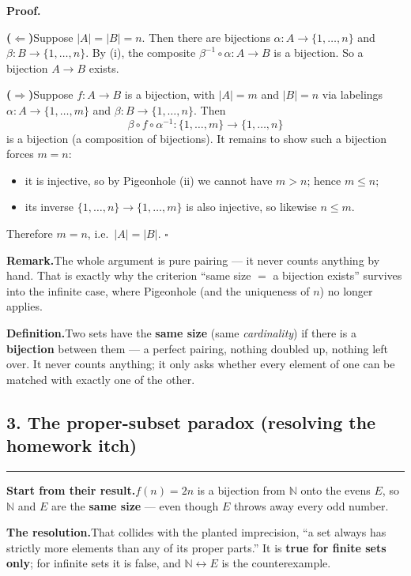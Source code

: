 \documentclass[12pt]{article}
\begin{document}
\textbf{Proof.}

\textbf{($\Leftarrow$)}\quad Suppose $|A| = |B| = n$. Then there are bijections $\alpha\colon A \to \{1,\dots,n\}$ and $\beta\colon B \to \{1,\dots,n\}$. By (i), the composite $\beta^{-1} \circ \alpha \colon A \to B$ is a bijection. So a bijection $A \to B$ exists.

\textbf{($\Rightarrow$)}\quad Suppose $f\colon A \to B$ is a bijection, with $|A| = m$ and $|B| = n$ via labelings $\alpha\colon A \to \{1,\dots,m\}$ and $\beta\colon B \to \{1,\dots,n\}$. Then
\[
  \beta \circ f \circ \alpha^{-1} \colon \{1,\dots,m\} \to \{1,\dots,n\}
\]
is a bijection (a composition of bijections). It remains to show such a bijection forces $m = n$:
\begin{itemize}
  \item it is injective, so by Pigeonhole (ii) we cannot have $m > n$; hence $m \le n$;
  \item its inverse $\{1,\dots,n\} \to \{1,\dots,m\}$ is also injective, so likewise $n \le m$.
\end{itemize}
Therefore $m = n$, i.e.\ $|A| = |B|$. $\square$

\textbf{Remark.}\quad The whole argument is pure pairing --- it never counts anything by hand. That is exactly why the criterion ``same size $=$ a bijection exists'' survives into the infinite case, where Pigeonhole (and the uniqueness of $n$) no longer applies.

\textbf{Definition.}\quad Two sets have the \textbf{same size} (same \emph{cardinality}) if there is a \textbf{bijection} between them --- a perfect pairing, nothing doubled up, nothing left over. It never counts anything; it only asks whether every element of one can be matched with exactly one of the other.

\subsection*{3. The proper-subset paradox (resolving the homework itch)}
\hrule
\textbf{Start from their result.}\quad $f(n) = 2n$ is a bijection from $\mathbb{N}$ onto the evens $E$, so $\mathbb{N}$ and $E$ are the \textbf{same size} --- even though $E$ throws away every odd number.

\textbf{The resolution.}\quad That collides with the planted imprecision, ``a set always has strictly more elements than any of its proper parts.'' It is \textbf{true for finite sets only}; for infinite sets it is false, and $\mathbb{N} \leftrightarrow E$ is the counterexample.
\end{document}
